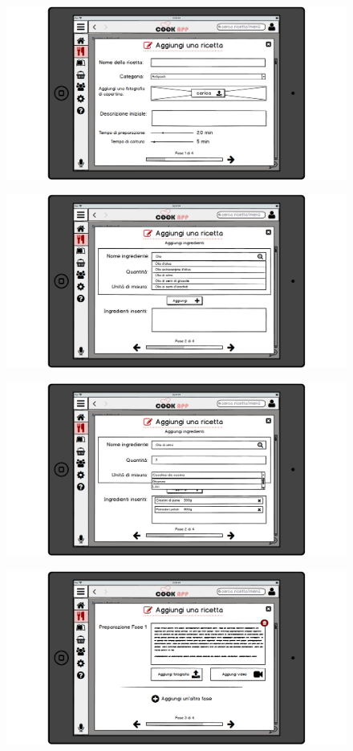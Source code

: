 \begin{figure}[H]
	\centering
	\includegraphics[width=0.95\linewidth]{img/mockup/Aggiungi-ricetta1.png}
\end{figure}
\begin{figure}[H]
	\centering
	\includegraphics[width=0.95\linewidth]{img/mockup/Aggiungi-ricetta2.png}
\end{figure}
\begin{figure}[H]
	\centering
	\includegraphics[width=0.95\linewidth]{img/mockup/Aggiungi-ricetta3.png}
\end{figure}
\begin{figure}[H]
	\centering
	\includegraphics[width=0.95\linewidth]{img/mockup/Aggiungi-ricetta4.png}
\end{figure}
